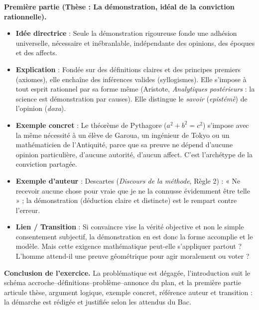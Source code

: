 \documentclass[11pt]{article}
\begin{document}
\begin{exoresolu}
\begin{quote}
\end{quote}
\textbf{Première partie (Thèse : La démonstration, idéal de la conviction rationnelle).}
\begin{itemize}
\item \textbf{Idée directrice} : Seule la démonstration rigoureuse fonde une adhésion universelle, nécessaire et inébranlable, indépendante des opinions, des époques et des affects.
\item \textbf{Explication} : Fondée sur des définitions claires et des principes premiers (axiomes), elle enchaîne des inférences valides (syllogismes). Elle s'impose à tout esprit rationnel par sa forme même (Aristote, \emph{Analytiques postérieurs} : la science est démonstration par causes). Elle distingue le \emph{savoir} (\emph{epistémè}) de l'opinion (\emph{doxa}).
\item \textbf{Exemple concret} : Le théorème de Pythagore ($a^2+b^2=c^2$) s'impose avec la même nécessité à un élève de Garoua, un ingénieur de Tokyo ou un mathématicien de l'Antiquité, parce que sa preuve ne dépend d'aucune opinion particulière, d'aucune autorité, d'aucun affect. C'est l'archétype de la conviction partagée.
\item \textbf{Exemple d'auteur} : Descartes (\emph{Discours de la méthode}, Règle 2) : « Ne recevoir aucune chose pour vraie que je ne la connusse évidemment être telle » ; la démonstration (déduction claire et distincte) est le rempart contre l'erreur.
\item \textbf{Lien / Transition} : Si convaincre vise la vérité objective et non le simple consentement subjectif, la démonstration en est donc la forme accomplie et le modèle. Mais cette exigence mathématique peut-elle s'appliquer partout ? L'homme attend-il une preuve géométrique pour agir moralement ou voter ?
\end{itemize}
\textbf{Conclusion de l'exercice.} La problématique est dégagée, l'introduction suit le schéma accroche--définitions--problème--annonce du plan, et la première partie articule thèse, argument logique, exemple concret, référence auteur et transition : la démarche est rédigée et justifiée selon les attendus du Bac.
\end{exoresolu}
\end{document}
